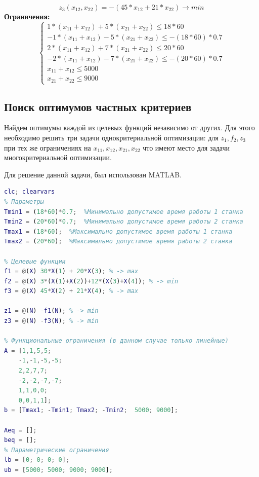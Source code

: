 \begin{equation}
z_3 (x_{12}, x_{22})= -(45*x_{12}+21*x_{22}) \rightarrow min
\end{equation}
\textbf{Ограничения:}
\begin{equation}
\begin{cases}
1*(x_{11}+x_{12})+5*(x_{21}+x_{22})\leq 18*60\\
-1*(x_{11}+x_{12})-5*(x_{21}+x_{22})\leq -(18*60)*0.7\\
2*(x_{11}+x_{12})+7*(x_{21}+x_{22})\leq 20*60\\
-2*(x_{11}+x_{12})-7*(x_{21}+x_{22})\leq -(20*60)*0.7\\
x_{11}+x_{12}\leq 5000\\
x_{21}+x_{22}\leq 9000
\end{cases}
\end{equation}
\subsection{Поиск оптимумов частных критериев}
Найдем оптимумы каждой из целевых функций независимо от других. Для этого необходимо решить три задачи однокритериальной оптимизации: для $z_1, f_2, z_3$ при тех же ограничениях на $x_{11}, x_{12}, x_{21}, x_{22}$ что имеют место для задачи многокритериальной оптимизации.

Для решение данной задачи, был использован MATLAB.
\begin{lstlisting}[language={matlab}, caption={Скрипт с общими параметрами}, label={lst:0}]
clc; clearvars
% Параметры
Tmin1 = (18*60)*0.7;  %Минимально допустимое время работы 1 станка
Tmin2 = (20*60)*0.7;  %Минимально допустимое время работы 2 станка
Tmax1 = (18*60);  %Максимально допустимое время работы 1 станка
Tmax2 = (20*60);  %Максимально допустимое время работы 2 станка

% Целевые функции
f1 = @(X) 30*X(1) + 20*X(3); % -> max
f2 = @(X) 3*(X(1)+X(2))+12*(X(3)+X(4)); % -> min
f3 = @(X) 45*X(2) + 21*X(4); % -> max

z1 = @(N) -f1(N); % -> min
z3 = @(N) -f3(N); % -> min

% Функциональные ограничения (в данном случае только линейные)
A = [1,1,5,5;
    -1,-1,-5,-5;
    2,2,7,7;
    -2,-2,-7,-7;
    1,1,0,0;
    0,0,1,1];
b = [Tmax1; -Tmin1; Tmax2; -Tmin2;  5000; 9000];

Aeq = [];
beq = [];
% Параметрические ограничения
lb = [0; 0; 0; 0];
ub = [5000; 5000; 9000; 9000];
\end{lstlisting}

